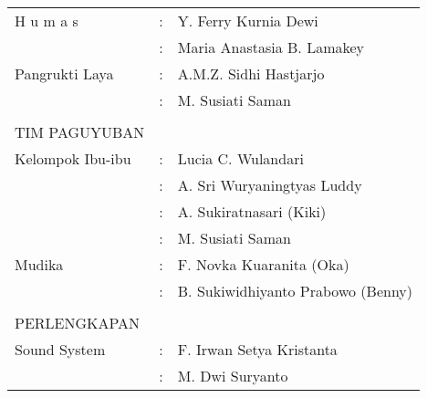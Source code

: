 \documentclass[a5paper,titlepage,11pt]{book}
\begin{document}
\begin{tabular}{p{5cm}cp{5cm}}
\hspace{0.75cm}H u m a s&:&  Y. Ferry Kurnia Dewi\\
&:&  Maria Anastasia B. Lamakey\\
\hspace{0.75cm}Pangrukti Laya&:&  A.M.Z. Sidhi Hastjarjo\\
&:&  M. Susiati Saman\\
\\
TIM PAGUYUBAN\\
\hspace{0.75cm}Kelompok Ibu-ibu&:&  Lucia C. Wulandari\\
&:&  A. Sri Wuryaningtyas Luddy\\
&:&  A. Sukiratnasari (Kiki)\\
&:&  M. Susiati Saman\\
\hspace{0.75cm}Mudika&:&  F. Novka Kuaranita (Oka)\\
&:&  B. Sukiwidhiyanto Prabowo (Benny)\\
\\
PERLENGKAPAN\\
\hspace{0.75cm}Sound System&:& F. Irwan Setya Kristanta\\
&:& M. Dwi Suryanto\\
\end{tabular}
\newpage
\end{document}

